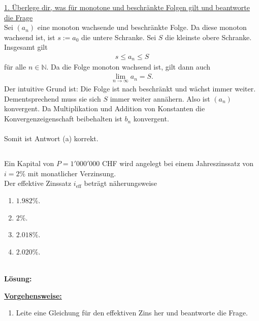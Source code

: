 \underline{1. Überlege dir, was für monotone und beschränkte Folgen gilt und beantworte die Frage}\\
Sei $ (a_n) $ eine monoton wachsende und beschränkte Folge.
Da diese monoton wachsend ist, ist $ s := a_0  $ die untere Schranke.
Sei $ S $ die kleinste obere Schranke. Insgesamt gilt
\begin{align*}
s \leq a_n \leq S
\end{align*}
für alle $ n \in \mathbb{N} $.
Da die Folge monoton wachsend ist, gilt dann auch
\begin{align*}
\lim \limits_{n \to \infty} a_n = S.
\end{align*}
Der intuitive Grund ist: Die Folge ist nach beschränkt und wächst immer weiter. Dementsprechend muss sie sich $ S $ immer weiter annähern.
Also ist $ (a_n) $ konvergent. Da Multiplikation und Addition von Konstanten die Konvergenzeigenschaft beibehalten ist $ b_n $ konvergent.\\
\\ 
Somit ist Antwort (a) korrekt.

\newpage

\subsection*{}
Ein Kapital von $ P = 1'000'000 $ CHF wird angelegt bei einem Jahreszinssatz von $ i = 2\% $ mit monatlicher Verzinsung.\\
Der effektive Zinssatz $ i_{\textrm{eff}} $ beträgt näherungsweise 
\renewcommand{\labelenumi}{(\alph{enumi})}
\begin{enumerate}
	\item 
	$ 1.982 \% $.
	\item 
	$ 2 \% $.
	\item 
	$ 2.018 \% $.
	\item
	$ 2.020 \% $.
\end{enumerate}
\ \\
\textbf{Lösung:}
\begin{mdframed}
\underline{\textbf{Vorgehensweise:}}
\renewcommand{\labelenumi}{\theenumi.}
\begin{enumerate}
\item Leite eine Gleichung für den effektiven Zins her und beantworte die Frage.
\end{enumerate}
\end{mdframed}

